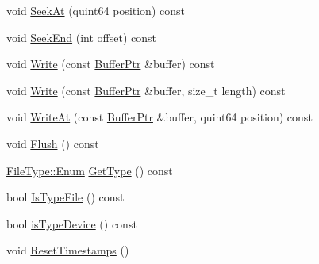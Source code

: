 \begin{DoxyCompactItemize}
\item 
void \hyperlink{class_gost_crypt_1_1_volume_1_1_volume_file_a9c54f29956e49f4c1cd72827343baf08}{Seek\+At} (quint64 position) const
\item 
void \hyperlink{class_gost_crypt_1_1_volume_1_1_volume_file_a06be8984a77477f80a48cfff993a82d9}{Seek\+End} (int offset) const
\item 
void \hyperlink{class_gost_crypt_1_1_volume_1_1_volume_file_a583e2bc2ca68b887e5c58ce56b237b02}{Write} (const \hyperlink{class_gost_crypt_1_1_buffer_ptr}{Buffer\+Ptr} \&buffer) const
\item 
void \hyperlink{class_gost_crypt_1_1_volume_1_1_volume_file_a149f808af3695cb419dd3a724d197240}{Write} (const \hyperlink{class_gost_crypt_1_1_buffer_ptr}{Buffer\+Ptr} \&buffer, size\+\_\+t length) const
\item 
void \hyperlink{class_gost_crypt_1_1_volume_1_1_volume_file_ac8c594f62df6eb92a8a8b37f20540541}{Write\+At} (const \hyperlink{class_gost_crypt_1_1_buffer_ptr}{Buffer\+Ptr} \&buffer, quint64 position) const
\item 
void \hyperlink{class_gost_crypt_1_1_volume_1_1_volume_file_ad4c5ba907a026250941c2edb8c80055d}{Flush} () const
\item 
\hyperlink{struct_gost_crypt_1_1_volume_1_1_file_type_a83c327e2ac3e4260e070028644f577f7}{File\+Type\+::\+Enum} \hyperlink{class_gost_crypt_1_1_volume_1_1_volume_file_a58e101a40bfb775b215d40e00f3e51f9}{Get\+Type} () const
\item 
bool \hyperlink{class_gost_crypt_1_1_volume_1_1_volume_file_a994bad691604a84166aff34f82754029}{Is\+Type\+File} () const
\item 
bool \hyperlink{class_gost_crypt_1_1_volume_1_1_volume_file_ab6f4d33ae4d5df99743fba37e22f5f14}{is\+Type\+Device} () const
\item 
void \hyperlink{class_gost_crypt_1_1_volume_1_1_volume_file_a471b53a516bcb26419fc84241cc064b2}{Reset\+Timestamps} ()
\end{DoxyCompactItemize}
